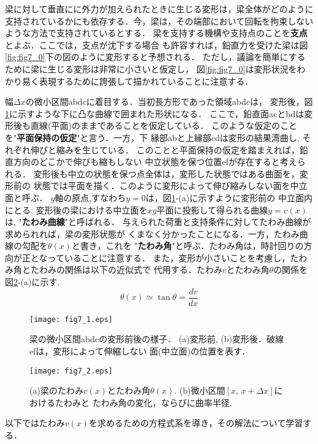 \documentclass[10pt,a4j]{jbook}
\begin{document}
梁に対して垂直にに外力が加えられたときに生じる変形は，梁全体がどのように
支持されているかにも依存する．今，梁は，その端部において回転を拘束しない
ような方法で支持されているとする．
梁を支持する機構や支持点のことを{\bf 支点}とよぶ．ここでは，支点が沈下する場合
も許容すれば，鉛直力を受けた梁は図\ref{fig:fig7_0}下の図のように変形すると予想される．
ただし，議論を簡単にするために梁に生じる変形は非常に小さいと仮定し，
図\ref{fig:fig7_0}は変形状況をわかり易く表現するために誇張して描かれていることに注意する．


幅$\Delta x$の微小区間abdcに着目する．当初長方形であった領域abdcは，
変形後，図\ref{fig:fig7_1}に示すような下に凸な曲線で囲まれた形状になる．
ここで，鉛直面acとbdは変形後も直線(平面)のままであることを仮定している．
このような仮定のことを"{\bf 平面保持の仮定}"と言う．一方，下
縁部abと上縁部cdは変形の結果湾曲し, それぞれ伸びと縮みを生じている．
このことと平面保持の仮定を踏まえれば，鉛直方向のどこかで伸びも縮もしない
中立状態を保つ位置efが存在すると考えられる．
変形後も中立の状態を保つ点全体は，変形した状態ではある曲面を，変形前の
状態では平面を描く．このように変形によって伸び縮みしない面を中立面と呼ぶ．
$y$軸の原点,すなわち$y=0$は，図\ref{fig:fig7_1}-(a)に示すように変形前の
中立面内にとる. 変形後の梁における中立面を$xy$平面に投影して得られる曲線$y=v(x)$は,
"{\bf たわみ曲線}"と呼ばれる．
与えられた荷重と支持条件に対してたわみ曲線が求められれば，梁の変形状態が
くまなく分かったことになる．一方，たわみ曲線の勾配を$\theta(x)$と書き，これを
"{\bf たわみ角}"と呼ぶ．たわみ角は，時計回りの方向が正となっていることに注意する．
また，変形が小さいことを考慮し，たわみ角とたわみの関係は以下の近似式で
代用する．たわみ$v$とたわみ角$\theta$の関係を図\ref{fig:fig7_2}-(a)に示す.
\begin{equation}
	\theta(x) \simeq \tan \theta =\frac{dv}{dx}
	\label{eqn:th_apprx}
\end{equation}
\begin{figure}
	\begin{center}
	\texttt{[image: fig7\_1.eps]} 
	\end{center}
	\caption{
		梁の微小区間abdcの変形前後の様子．
		(a)変形前, (b)変形後．破線efは，変形によって伸縮しない
		面(中立面)の位置を表す．
	} 
	\label{fig:fig7_1}
\end{figure}
\begin{figure}
	\begin{center}
	\texttt{[image: fig7\_2.eps]} 
	\end{center}
	\caption{
	(a)梁のたわみ$v(x)$とたわみ角$\theta(x)$. 
	(b)微小区間$\left[x, \, x+\Delta x \right]$におけるたわみと
	たわみ角の変化，ならびに曲率半径.
	 } 
	\label{fig:fig7_2}
\end{figure}
以下ではたわみ$v(x)$を求めるための方程式系を導き，その解法について学習する．
\end{document}
